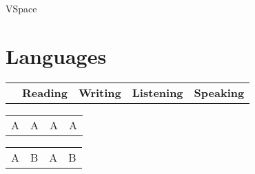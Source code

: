 

    {VSpace}

\section{Languages}

\begin{tabular}
    {
        p{66mm} p{28mm} p{28mm} p{28mm} p{28mm}
    }
    \textbf{} & \textbf{Reading} & \textbf{Writing} & \textbf{Listening} & \textbf{Speaking}
\end{tabular}

    {
	    \begin{tabular}
	        {
	            p{28mm} p{28mm} p{28mm} p{28mm}
	        }
	        A & A & A & A
	    \end{tabular}
	}

    {
	    \begin{tabular}
	        {
	            p{28mm} p{28mm} p{28mm} p{28mm}
            }
		    A & B & A & B
	    \end{tabular}
    }

